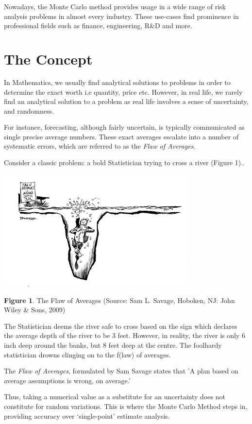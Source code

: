 \documentclass{resonance}
\begin{document}
	Nowadays, the Monte Carlo method provides usage in a wide range of risk analysis problems in almost every industry. These use-cases find prominence in professional fields such as finance, engineering, R\&D and more.
	
	\section{The Concept}
	In Mathematics, we usually find analytical solutions to problems in order to determine the exact worth i.e quantity, price etc. However, in real life, we rarely find an analytical solution to a problem as real life involves a sense of uncertainty, and randomness.
	
	For instance, forecasting, although fairly uncertain, is typically communicated as single precise average numbers. These exact averages escalate into a number of systematic errors, which are referred to as the \emph{Flaw of Averages}.
	
	Consider a classic problem: a bold Statistician trying to cross a river (Figure 1)..
	
	\includegraphics[width=10cm]{the-flaw-of-averages}
	
	\scriptsize{\textbf{Figure 1}. The Flaw of Averages (Source: Sam L. Savage, Hoboken, NJ: John Wiley \& Sons, 2009)}
	
	\normalsize
	The Statistician deems the river safe to cross based on the sign which declares the average depth of the river to be 3 feet. However, in reality, the river is only 6 inch deep around the banks, but 8 feet deep at the centre. The foolhardy statistician drowns clinging on to the f(law) of averages.
	
	The \emph{Flaw of Averages}, formulated by Sam Savage states that 'A plan based on average assumptions is wrong, on average.'
	
	Thus, taking a numerical value as a substitute for an uncertainty does not constitute for random variations. This is where the Monte Carlo Method steps in, providing accuracy over ‘single-point’ estimate analysis.
	
\end{document}
